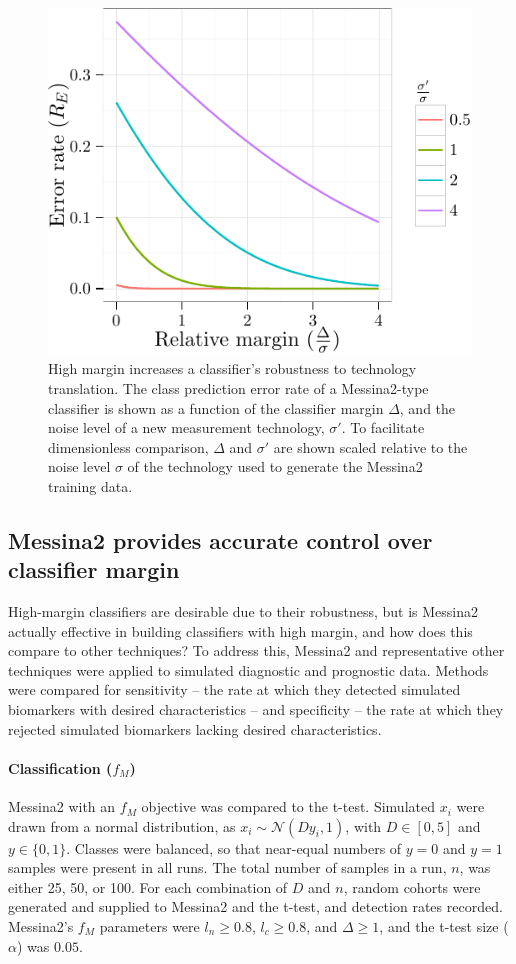 \documentclass[dissertation.tex]{subfiles}
\begin{document}
\begin{figure}[!htbp]
\centering
\includegraphics[width=.7\linewidth]{analysis/messina/figure/05-E1-E1A3-1}
\caption[High margin increases classifier robustness]{High margin increases a classifier's robustness to technology translation.  The class prediction error rate of a Messina2-type classifier is shown as a function of the classifier margin $\Delta$, and the noise level of a new measurement technology, $\sigma'$.  To facilitate dimensionless comparison, $\Delta$ and $\sigma'$ are shown scaled relative to the noise level $\sigma$ of the technology used to generate the Messina2 training data.}\label{fig:mess-margin-good}
\end{figure}

\subsection[Messina2 controls classifier margin]{Messina2 provides accurate control over classifier margin}
High-margin classifiers are desirable due to their robustness, but is Messina2 actually effective in building classifiers with high margin, and how does this compare to other techniques?  To address this, Messina2 and representative other techniques were applied to simulated diagnostic and prognostic data.  Methods were compared for sensitivity -- the rate at which they detected simulated biomarkers with desired characteristics -- and specificity -- the rate at which they rejected simulated biomarkers lacking desired characteristics.

\paragraph{Classification ($f_M$)}
Messina2 with an $f_M$ objective was compared to the t-test.  Simulated $x_i$ were drawn from a normal distribution, as $x_i \sim \mathcal{N}(D y_i, 1)$, with $D \in [0, 5]$ and $y \in \{0, 1\}$.  Classes were balanced, so that near-equal numbers of $y = 0$ and $y = 1$ samples were present in all runs.  The total number of samples in a run, $n$, was either 25, 50, or 100.  For each combination of $D$ and $n$,  random cohorts were generated and supplied to Messina2 and the t-test, and detection rates recorded.  Messina2's $f_M$ parameters were $l_n \geq 0.8$, $l_c \geq 0.8$, and $\Delta \geq 1$, and the t-test size ($\alpha$) was $0.05$.
\end{document}

